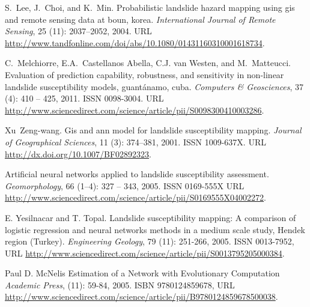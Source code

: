 \documentclass[11pt,twoside]{rmta2010esp}%
\begin{document}
\begin{thebibliography}{99}
S.~Lee, J.~Choi, and K.~Min.
\newblock Probabilistic landslide hazard mapping using gis and remote sensing
  data at boun, korea.
\newblock \emph{International Journal of Remote Sensing}, 25
  (11): 2037--2052, 2004.
\newblock URL
  \url{http://www.tandfonline.com/doi/abs/10.1080/01431160310001618734}.

C.~Melchiorre, E.A.~Castellanos Abella, C.J. van Westen, and M.~Matteucci.
\newblock Evaluation of prediction capability, robustness, and sensitivity in
  non-linear landslide susceptibility models, guantánamo, cuba.
\newblock \emph{Computers {\&} Geosciences}, 37 (4): 410 --
  425, 2011.
\newblock ISSN 0098-3004.
\newblock URL
  \url{http://www.sciencedirect.com/science/article/pii/S0098300410003286}.

Xu~Zeng-wang.
\newblock Gis and ann model for landslide susceptibility mapping.
\newblock \emph{Journal of Geographical Sciences}, 11 (3):
  374--381, 2001.
\newblock ISSN 1009-637X.
\newblock URL \url{http://dx.doi.org/10.1007/BF02892323}.


Artificial neural networks applied to landslide susceptibility assessment.
\newblock \emph{Geomorphology}, 66 (1–4): 327 -- 343, 2005.
\newblock ISSN 0169-555X
\newblock URL \url{http://www.sciencedirect.com/science/article/pii/S0169555X04002272}.



E. Yesilnacar and T. Topal.
\newblock Landslide susceptibility mapping: A comparison of logistic regression and neural networks methods in a medium scale study, Hendek region (Turkey).
\newblock \emph{Engineering Geology}, 79
  (11): 251-266, 2005.
\newblock ISSN 0013-7952,
\newblock URL
  \url{http://www.sciencedirect.com/science/article/pii/S0013795205000384}.


Paul D. McNelis
\newblock Estimation of a Network with Evolutionary Computation
\newblock \emph{Academic Press},
  (11): 59-84, 2005.
\newblock ISBN 9780124859678,
\newblock URL
  \url{http://www.sciencedirect.com/science/article/pii/B9780124859678500038}.



\end{thebibliography}
\end{document}
